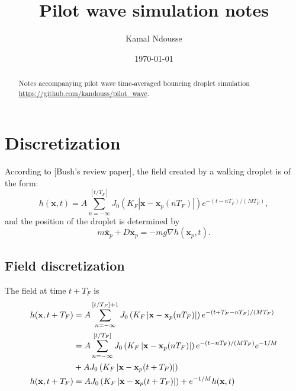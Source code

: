 \documentclass{article}
\newcommand{\x}{\mathbf{x}}
\begin{document}
\title{Pilot wave simulation notes}
\author{Kamal Ndousse}
\date{\today}

\maketitle

\begin{abstract}
Notes accompanying pilot wave time-averaged bouncing droplet simulation \url{https://github.com/kandouss/pilot_wave}.
\end{abstract}

\section{Discretization}
According to [Bush's review paper], the field created by a walking droplet is of the form:
\begin{equation}
	\label{eq:raw_field}
	h(\x,t) = A \sum_{n = -\infty}^{\left[ t/T_{F} \right]} J_{0} \left( K_{F} \left| \x - \x_{p}(n T_{F}) \right| \right) e^{-(t - n T_{F})/(M T_{F})},
\end{equation}
and the position of the droplet is determined by
\begin{equation}
	\label{eq:raw_droplet}
	m \ddot{\x_p} + D \dot{\x_p} = - m g \nabla h(\x_p,t).
\end{equation}

\subsection{Field discretization}
The field at time $t + T_{F}$ is
\begin{align}
	h(\x,t+T_F) &= A \sum_{n = -\infty}^{\left[ t/T_{F} \right]+1} J_{0} \left( K_{F} \left| \x - \x_{p}(n T_{F}) \right| \right) e^{-(t +T_F- n T_{F})/(M T_{F})} \notag \\
	 &= A \sum_{n = -\infty}^{\left[ t/T_{F} \right]} J_{0} \left( K_{F} \left| \x - \x_{p}(n T_{F}) \right| \right) e^{-(t- n T_{F})/(M T_{F})} e^{-1/M} \notag \\
	 & + A J_{0} \left( K_F \left| \x - \x_p(t + T_F) \right| \right) \notag \\
	h(\x,t+T_F) &= A J_0 \left( K_F \left| \x - \x_p(t + T_F) \right | \right) + e^{-1/M} h(\x,t) \label{eq:discrete_field}
\end{align}
\end{document}
